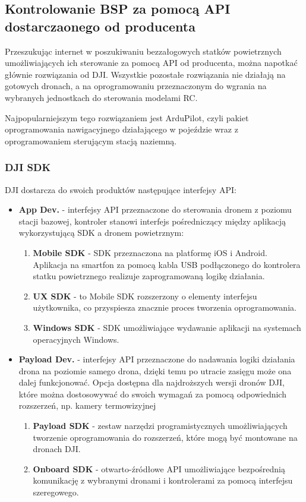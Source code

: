 \subsection{Kontrolowanie BSP za pomocą API dostarczaonego od producenta}
Przeszukując internet w poszukiwaniu bezzałogowych statków powietrznych umożliwiających ich sterowanie za pomocą API od producenta, można napotkać głównie rozwiązania od DJI. Wszystkie pozostałe rozwiązania nie działają na gotowych dronach, a na oprogramowaniu przeznaczonym do wgrania na wybranych jednostkach do sterowania modelami RC.

Najpopularniejszym tego rozwiązaniem jest ArduPilot, czyli pakiet oprogramowania nawigacyjnego działającego w pojeździe wraz z oprogramowaniem sterującym stacją naziemną.

\subsubsection{DJI SDK}
DJI dostarcza do swoich produktów następujące interfejsy API:
\begin{itemize}
  \item \textbf{App Dev.} - interfejsy API przeznaczone do sterowania dronem z poziomu stacji bazowej, kontroler stanowi interfejs pośredniczący między aplikacją wykorzystującą SDK a dronem powietrznym:\begin{enumerate}
    \item \textbf{Mobile SDK} - SDK przeznaczona na platformę iOS i Android. Aplikacja na smartfon za pomocą kabla USB podłączonego do kontrolera statku powietrznego realizuje zaprogramowaną logikę działania.
    \item \textbf{UX SDK} - to Mobile SDK rozszerzony o elementy interfejsu użytkownika, co przyspiesza znacznie proces tworzenia oprogramowania.
    \item \textbf{Windows SDK} - SDK umożliwiające wydawanie aplikacji na systemach operacyjnych Windows. 
  \end{enumerate}
  \item \textbf{Payload Dev.} - interfejsy API przeznaczone do nadawania logiki działania drona na poziomie samego drona, dzięki temu po utracie zasięgu może ona dalej funkcjonować. Opcja dostępna dla najdroższych wersji dronów DJI, które można dostosowywać do swoich wymagań za pomocą odpowiednich rozszerzeń, np. kamery termowizyjnej\begin{enumerate}
    \item \textbf{Payload SDK} - zestaw narzędzi programistycznych umożliwiających tworzenie oprogramowania do rozszerzeń, które mogą być montowane na dronach DJI. 
    \item \textbf{Onboard SDK} - otwarto-źródłowe API umożliwiające bezpośrednią komunikację z wybranymi dronami i kontrolerami za pomocą interfejsu szeregowego.
  \end{enumerate}
\end{itemize}


